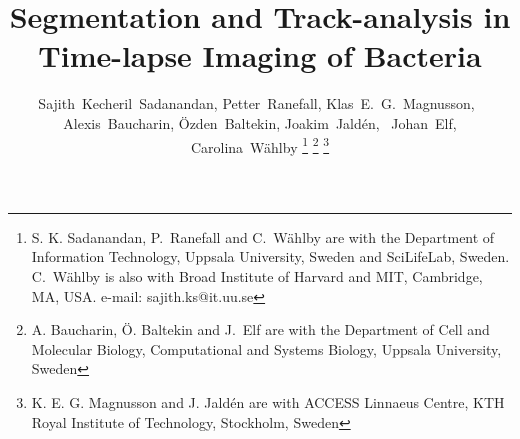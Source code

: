 \documentclass[journal]{IEEEtran}
\begin{document}
%
\title{Segmentation and Track-analysis in Time-lapse Imaging of Bacteria}
%
%
%

\author{Sajith~Kecheril~Sadanandan,
        Petter~Ranefall,
        Klas~E.~G.~Magnusson,~%
		Alexis~Baucharin,
		\"Ozden~Baltekin,
		Joakim~Jald\'en,~
		Johan~Elf,
		Carolina~W\"ahlby
\thanks{S. K. Sadanandan, P.~Ranefall and C.~W\"ahlby  are with the Department
of Information Technology, Uppsala University, Sweden and SciLifeLab, Sweden. C.~W\"ahlby is also with Broad Institute of Harvard and MIT, Cambridge, MA, USA.
e-mail: sajith.ks@it.uu.se}%
\thanks{A. Baucharin, \"O. Baltekin and J.~Elf are with the Department of Cell and Molecular Biology, Computational and Systems Biology, Uppsala University, Sweden }
\thanks{K. E. G. Magnusson and J. Jald\'en are with ACCESS Linnaeus Centre, KTH Royal Institute of Technology, Stockholm, Sweden }}%


% 
%
\end{document}
